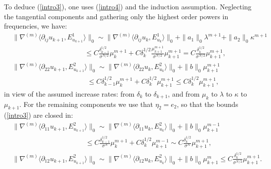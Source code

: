 \documentclass[reqno,twoside,11pt]{amsart}
\numberwithin{equation}{section}
\theoremstyle{plain}
\theoremstyle{definition}
\begin{document}
\medskip

To deduce (\ref{intro3}), one uses (\ref{intro4}) and the
induction assumption. Neglecting the tangential components and gathering
only the highest order powers in frequencies, we have:
\begin{equation*}
\begin{split}
& \|\nabla^{(m)} \langle \partial_{ij}u_{k+1},E^1_{u_{k+1}}\rangle\|_0\sim \|\nabla^{(m)}
\langle \partial_{ij}u_{k},E^1_{u_{k}}\rangle\|_0
+ \|a_1 \|_0\lambda^{m+1} + \|a_2 \|_0\kappa^{m+1} \\ & 
\qquad\qquad \qquad \qquad \qquad \;\, \leq C \frac{\delta_{k-1}^{1/2}}{\sigma^{N/2}}\mu_{k}^{m+1}
+ C \delta_k^{1/2}\frac{\mu_{k+1}^{m+1}}{\sigma^{N/2}}\mu_{k+1}^{m+1}
= C \frac{\delta_{k}^{1/2}}{\sigma^{N/2}}\mu_{k+1}^{m+1},\\
& \|\nabla^{(m)} \langle \partial_{22}u_{k+1},E^2_{u_{k+1}}\rangle \|_0\sim \|\nabla^{(m)}
\langle \partial_{22}u_{k},E^2_{u_{k}}\rangle \|_0
+ \|b \|_0\mu_{k+1}^{m+1}  \\ & 
\qquad\qquad \qquad \qquad \qquad \;\; \;\leq C \delta_{k-1}^{1/2}\mu_{k}^{m+1}
+ C{\delta_k^{1/2}}\mu_{k+1}^{m+1} \leq C {\delta_k^{1/2}}\mu_{k+1}^{m+1},
\end{split}
\end{equation*}
in view of the assumed increase rates: from $\delta_k$ to $\delta_{k+1}$, and from
$\mu_k$ to $\lambda$ to $\kappa$ to $\mu_{k+1}$. For the remaining
components we use that $\eta_2=e_2$, so that the bounds (\ref{intro3}) are closed in:
\begin{equation*}
\begin{split}
&\|\nabla^{(m)} \langle \partial_{11}u_{k+1},E^2_{u_{k+1}}\rangle\|_0\sim \|\nabla^{(m)}
\langle \partial_{11}u_{k},E^2_{u_{k}}\rangle\|_0 + \|b\|_0\mu_{k+1}^{m-1} \\ & 
\qquad\qquad \qquad \qquad \qquad \;\;
\leq C \frac{\delta_{k-1}^{1/2}}{\sigma^N}\mu_{k}^{m+1}
+ C {\delta_k^{1/2}}\mu_{k+1}^{m-1}
\sim C\frac{\delta_k^{1/2}}{\sigma^N}\mu_{k+1}^{m+1},\\
& \|\nabla^{(m)} \langle \partial_{12}u_{k+1},E^2_{u_{k+1}}\rangle\|_0\sim \|\nabla^{(m)}
\langle \partial_{12}u_{k},E^2_{u_{k}}\rangle\|_0 + \|b \|_0\mu_{k+1}^{m} 
\leq C\frac{\delta_k^{1/2}}{\sigma^{N/2}}\mu_{k+1}^{m+1}.
\end{split}
\end{equation*}

\medskip
\end{document}
